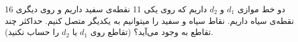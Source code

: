 دو خط موازی $d_1$ و $d_2$ داریم که روی یکی 11 نقطه‌ی سفید داریم و روی دیگری 16 نقطه‌ی سیاه داریم. نقاط سیاه و سفید را میتوانیم به یکدیگر متصل کنیم. حداکثر چند تقاطع به وجود می‌آید؟ (تقاطع روی $d_1$ یا $d_2$ را حساب نکنید).